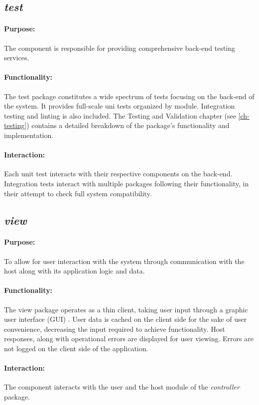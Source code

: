 \documentclass{thesis-ekf}
\theoremstyle{definition}
\theoremstyle{remark}
\begin{document}
{\subsection{\emph{test}}
\paragraph{Purpose:}
The component is responsible for providing comprehensive back-end testing services.
\paragraph{Functionality:}
The test package constitutes a wide spectrum of tests focusing on the back-end of the system. It provides full-scale uni tests organized by module. Integration testing and linting is also included. The Testing and Validation chapter (see \ref{ch-testing}) contains a detailed breakdown of the package's functionality and implementation.
\paragraph{Interaction:}
Each unit test interacts with their respective components on the back-end. Integration tests interact with multiple packages following their functionality, in their attempt to check full system compatibility.

\subsection{\emph{view}}
\paragraph{Purpose:}
To allow for user interaction with the system through communication with the host along with its application logic and data.
\paragraph{Functionality:}
The view package operates as a thin client, taking user input through a graphic user interface (GUI) \cite{Wiki-GUI}. User data is cached on the client side for the sake of user convenience, decreasing the input required to achieve functionality. Host responses, along with operational errors are displayed for user viewing. Errors are not logged on the client side of the application.
\paragraph{Interaction:}
The component interacts with the user and the host module of the \emph{controller} package.

}
\end{document}
